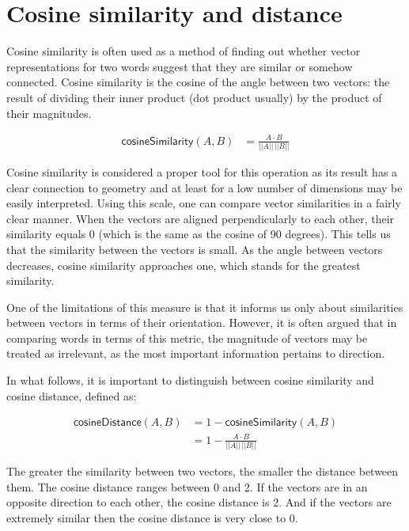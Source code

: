 \documentclass[12pt,]{book}
\begin{document}
\section{Cosine similarity and
distance}\label{cosine-similarity-and-distance}

Cosine similarity is often used as a method of finding out whether
vector representations for two words suggest that they are similar or
somehow connected. Cosine similarity is the cosine of the angle between
two vectors: the result of dividing their inner product (dot product
usually) by the product of their magnitudes.

\begin{align} \tag{Sim}
\mathsf{cosineSimilarity}(A,B) & = \frac{A \cdot B}{\vert \vert A \vert \vert \,\vert \vert B \vert \vert}
\end{align}

Cosine similarity is considered a proper tool for this operation as its
result has a clear connection to geometry and at least for a low number
of dimensions may be easily interpreted. Using this scale, one can
compare vector similarities in a fairly clear manner. When the vectors
are aligned perpendicularly to each other, their similarity equals 0
(which is the same as the cosine of 90 degrees). This tells us that the
similarity between the vectors is small. As the angle between vectors
decreases, cosine similarity approaches one, which stands for the
greatest similarity.

One of the limitations of this measure is that it informs us only about
similarities between vectors in terms of their orientation. However, it
is often argued that in comparing words in terms of this metric, the
magnitude of vectors may be treated as irrelevant, as the most important
information pertains to direction.

In what follows, it is important to distinguish between cosine
similarity and cosine distance, defined as:

\begin{align} \tag{Sim}
\mathsf{cosineDistance}(A,B) &  = 1 - \mathsf{cosineSimilarity}(A,B)\\
 &  = 1 - \frac{A \cdot B}{\vert \vert A \vert \vert \,\vert \vert B \vert \vert} \nonumber
\end{align}

The greater the similarity between two vectors, the smaller the distance
between them. The cosine distance ranges between 0 and 2. If the vectors
are in an opposite direction to each other, the cosine distance is 2.
And if the vectors are extremely similar then the cosine distance is
very close to 0.
\end{document}
